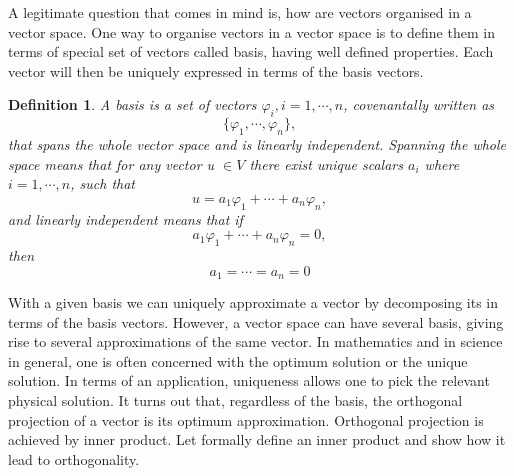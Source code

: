 \documentclass[11pt, oneside]{article}   	%
\newtheorem{definition}{Definition}
\begin{document}
A legitimate question that comes in mind is, how are vectors organised in a vector space. One way to organise vectors in a vector space is to define them in terms of special set of vectors called basis, having well defined properties. Each vector will then be uniquely expressed in terms of the basis vectors. 
\justify
\begin{definition}
A basis is a set of vectors $\varphi_{i}, i = 1, \cdots, n$, covenantally written as 
\begin{equation}
\{ \varphi_{1}, \cdots, \varphi_{n} \} \nonumber,
\end{equation}
that spans the whole vector space and is linearly independent. Spanning the whole space means that for any vector u $\in V$ there exist unique scalars $a_{i}$ where $i=1,\cdots,n$, such that 
\begin{equation}
u = a_{1}\varphi_{1} + \cdots + a_{n}\varphi_{n} \nonumber,
\end{equation}
and linearly independent means that if
\begin{equation}
a_{1}\varphi_{1} + \cdots + a_{n}\varphi_{n} = 0 \nonumber,
\end{equation}
then 
\begin{equation}
a_{1} = \cdots = a_{n} = 0 \nonumber
\end{equation}
\end{definition}
\justify
With a given basis we can uniquely approximate a vector by decomposing its in terms of the basis vectors. However, a vector space can have several basis, giving rise to several approximations of the same vector. In mathematics and in science in general, one is often concerned with the optimum solution or the unique solution. In terms of an application, uniqueness allows one to pick the relevant physical solution.
It turns out that, regardless of the basis, the orthogonal projection of a vector is its optimum approximation. Orthogonal projection is achieved by inner product. Let formally define an inner product and show how it lead to orthogonality.
\end{document}
